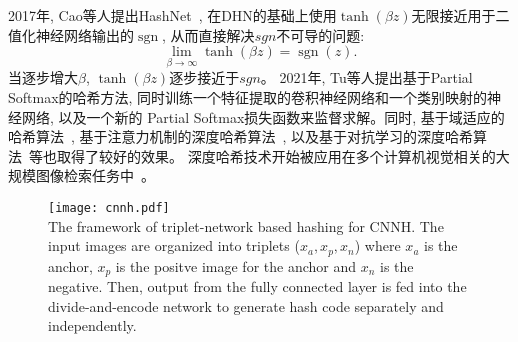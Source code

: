 2017年, Cao等人提出HashNet~\cite{cao2017hashnet},  在DHN的基础上使用$\operatorname{tanh}(\beta z)$无限接近用于二值化神经网络输出的$\operatorname{sgn}$, 从而直接解决$sgn$不可导的问题:
\begin{equation}
    \lim _{\beta \rightarrow \infty} \tanh (\beta z)=\operatorname{sgn}(z).
\end{equation}
当逐步增大$\beta$, $\operatorname{tanh}(\beta z)$逐步接近于$sgn$。
2021年, Tu等人提出基于Partial Softmax的哈希方法, 同时训练一个特征提取的卷积神经网络和一个类别映射的神经网络, 以及一个新的 Partial Softmax损失函数来监督求解。同时, 基于域适应的哈希算法~\cite{fyw2018}, 基于注意力机制的深度哈希算法~\cite{jhj2021,cg2020}, 以及基于对抗学习的深度哈希算法~\cite{yr2021}等也取得了较好的效果。 深度哈希技术开始被应用在多个计算机视觉相关的大规模图像检索任务中~\cite{csg2020,qh2018, ljn2019 }。
\begin{figure}[!htp]
    \centering
    \texttt{[image: cnnh.pdf]} \\
      {The framework of triplet-network based hashing for CNNH. The input images are organized into triplets ($x_a, x_p, x_n$) where $x_a$ is the anchor, $x_p$ is the positve image for the anchor and $x_n$ is the negative. Then, output from the fully connected layer  is fed into the divide-and-encode network to generate hash code separately and independently.}
   \label{fig:trihash}
\end{figure}
